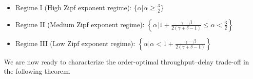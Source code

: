 \documentclass[10pt,journal,compsoc,onecolumn]{IEEEtran}
\begin{document}
\begin{itemize}
\item Regime I (High Zipf exponent regime): $\lbrace
\alpha\vert\alpha \geq \frac{3}{2}\rbrace$ \item Regime II (Medium
Zipf exponent regime): $ \left\lbrace \alpha \bigg\vert
1+\frac{\gamma-\beta}{2(\gamma+\delta-1)}\leq\alpha < \frac{3}{2}
\right\rbrace  \nonumber $ \item Regime III (Low Zipf exponent
regime): $ \left\lbrace \alpha \bigg\vert \alpha <
1+\frac{\gamma-\beta}{2(\gamma+\delta-1)} \right\rbrace \nonumber
$
\end{itemize}

We are now ready to characterize the order-optimal throughput--delay trade-off in the following theorem.
\end{document}
